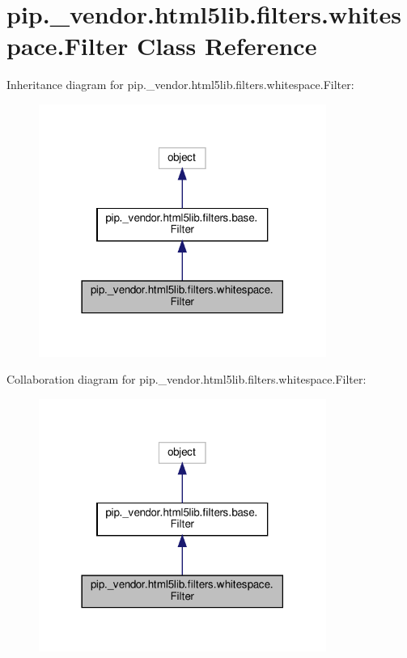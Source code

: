 \hypertarget{classpip_1_1__vendor_1_1html5lib_1_1filters_1_1whitespace_1_1Filter}{}\section{pip.\+\_\+vendor.\+html5lib.\+filters.\+whitespace.\+Filter Class Reference}
\label{classpip_1_1__vendor_1_1html5lib_1_1filters_1_1whitespace_1_1Filter}


Inheritance diagram for pip.\+\_\+vendor.\+html5lib.\+filters.\+whitespace.\+Filter\+:
\nopagebreak
\begin{figure}[H]
\begin{center}
\leavevmode
\includegraphics[width=266pt]{classpip_1_1__vendor_1_1html5lib_1_1filters_1_1whitespace_1_1Filter__inherit__graph}
\end{center}
\end{figure}


Collaboration diagram for pip.\+\_\+vendor.\+html5lib.\+filters.\+whitespace.\+Filter\+:
\nopagebreak
\begin{figure}[H]
\begin{center}
\leavevmode
\includegraphics[width=266pt]{classpip_1_1__vendor_1_1html5lib_1_1filters_1_1whitespace_1_1Filter__coll__graph}
\end{center}
\end{figure}
